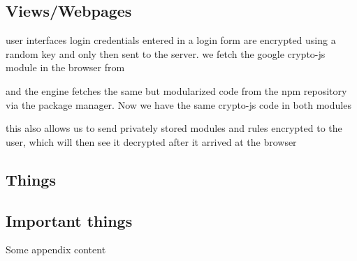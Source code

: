 \documentclass{article}
\begin{document}
\subsection{Views/Webpages}
user interfaces
login
credentials entered in a login form are encrypted using a random key and only then sent to the server.
we fetch the google crypto-js module in the browser from

and the engine fetches the same but modularized code from the npm repository via the package manager. Now we have the same crypto-js code in both modules

this also allows us to send privately stored modules and rules encrypted to the user, which will then see it decrypted after it arrived at the browser







\newpage
\renewcommand*\appendixpagename{APPENDIX}
\renewcommand*\appendixtocname{APPENDIX}
\begin{appendices}
 \section{Things}
   \subsection{Important things}
 Some appendix content
 
\end{appendices}
\end{document}
